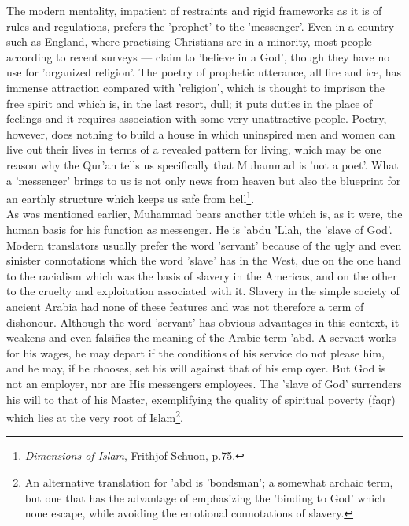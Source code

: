\documentclass[11pt, b5paper, twoside]{book}
\begin{document}
The modern mentality, impatient of restraints and rigid frameworks as it is of rules and regulations, 
prefers the 'prophet' to the 'messenger'. Even in a country such as England, where practising 
Christians are in a minority, most people --- according to recent surveys --- claim to 'believe in a 
God', though they have no use for 'organized religion'. The poetry of prophetic utterance, all fire 
and ice, has immense attraction compared with 'religion', which is thought to imprison the free 
spirit and which is, in the last resort, dull; it puts duties in the place of feelings and it 
requires association with some very unattractive people. Poetry, however, does nothing to build a 
house in which uninspired men and women can live out their lives in terms of a revealed pattern for 
living, which may be one reason why the Qur'an tells us specifically that Muhammad is 'not a poet'. 
What a 'messenger' brings to us is not only news from heaven but also the blueprint for an earthly 
structure which keeps us safe from hell\footnote{\emph{Dimensions of Islam}, Frithjof Schuon, p.75.}. \\

As was mentioned earlier, Muhammad bears another title which is, as it were, the human basis for his 
function as messenger. He is 'abdu 'Llah, the 'slave of God'. Modern translators usually prefer the 
word 'servant' because of the ugly and even sinister connotations which the word 'slave' has in the 
West, due on the one hand to the racialism which was the basis of slavery in the Americas, and on the 
other to the cruelty and exploitation associated with it. Slavery in the simple society of ancient 
Arabia had none of these features and was not therefore a term of dishonour. Although the word 
'servant' has obvious advantages in this context, it weakens and even falsifies the meaning of the 
Arabic term 'abd. A servant works for his wages, he may depart if the conditions of his service do 
not please him, and he may, if he chooses, set his will against that of his employer. But God is not 
an employer, nor are His messengers employees. The 'slave of God' surrenders his will to that of his 
Master, exemplifying the quality of spiritual poverty (faqr) which lies at the very root of Islam\footnote{An alternative translation for 'abd is 'bondsman'; a somewhat archaic term, but one that has the 
advantage of emphasizing the 'binding to God' which none escape, while avoiding the emotional 
connotations of slavery.}. \\
\end{document}
